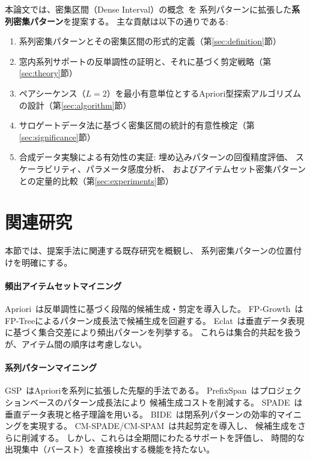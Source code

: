 \documentclass[11pt,a4paper]{article}
\begin{document}
本論文では、密集区間（Dense Interval）の概念~\cite{DenseInterval}を
系列パターンに拡張した\textbf{系列密集パターン}を提案する。
主な貢献は以下の通りである:

\begin{enumerate}[leftmargin=2em]
  \item 系列密集パターンとその密集区間の形式的定義（第\ref{sec:definition}節）
  \item 窓内系列サポートの反単調性の証明と、それに基づく剪定戦略（第\ref{sec:theory}節）
  \item ペアシーケンス（$L=2$）を最小有意単位とするApriori型探索アルゴリズムの設計（第\ref{sec:algorithm}節）
  \item サロゲートデータ法に基づく密集区間の統計的有意性検定（第\ref{sec:significance}節）
  \item 合成データ実験による有効性の実証: 埋め込みパターンの回復精度評価、
        スケーラビリティ、パラメータ感度分析、
        およびアイテムセット密集パターンとの定量的比較（第\ref{sec:experiments}節）
\end{enumerate}

\section{関連研究}
\label{sec:related}

本節では、提案手法に関連する既存研究を概観し、
系列密集パターンの位置付けを明確にする。

\paragraph{頻出アイテムセットマイニング}
Apriori~\cite{Agrawal1994}は反単調性に基づく段階的候補生成・剪定を導入した。
FP-Growth~\cite{Han2000}はFP-Treeによるパターン成長法で候補生成を回避する。
Eclat~\cite{Zaki2000}は垂直データ表現に基づく集合交差により頻出パターンを列挙する。
これらは集合的共起を扱うが、アイテム間の順序は考慮しない。

\paragraph{系列パターンマイニング}
GSP~\cite{Agrawal1995}はAprioriを系列に拡張した先駆的手法である。
PrefixSpan~\cite{Pei2001}はプロジェクションベースのパターン成長法により
候補生成コストを削減する。
SPADE~\cite{Zaki2001}は垂直データ表現と格子理論を用いる。
BIDE~\cite{Wang2004}は閉系列パターンの効率的マイニングを実現する。
CM-SPADE/CM-SPAM~\cite{Fournier2014}は共起剪定を導入し、
候補生成をさらに削減する。
しかし、これらは全期間にわたるサポートを評価し、
時間的な出現集中（バースト）を直接検出する機能を持たない。
\end{document}

